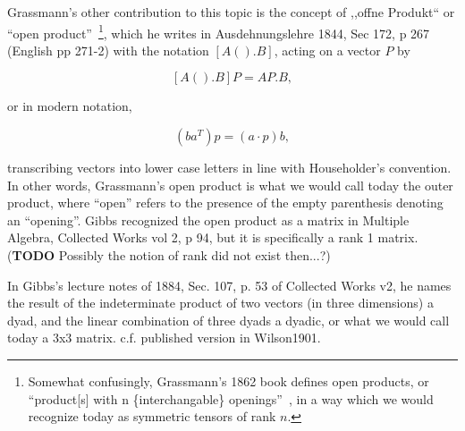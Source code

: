 Grassmann's other contribution to this topic is the concept of ,,offne Produkt`` or ``open product''~\footnote{Somewhat confusingly, Grassmann's 1862 book defines open products, or ``product[s] with n \{interchangable\} openings''~\cite[\S\S 353, p. 196]{Grassmann2000}, in a way which we would recognize today as symmetric tensors of rank $n$.}, which he writes in Ausdehnungslehre 1844, Sec 172, p 267 (English pp 271-2) with the notation $[A() . B]$, acting on a vector $P$ by

\[
[A() . B] P = AP . B,
\]

or in modern notation,

\[
(b a^T) p = (a\cdot p) b,
\]

transcribing vectors into lower case letters in line with Householder's convention. In other words, Grassmann's open product is what we would call today the outer product, where ``open'' refers to the presence of the empty parenthesis denoting an ``opening''. Gibbs recognized the open product as a matrix in Multiple Algebra, Collected Works vol 2, p 94, but it is specifically a rank 1 matrix. (\textbf{TODO} Possibly the notion of rank did not exist then...?) 

In Gibbs's lecture notes of 1884, Sec. 107, p. 53 of Collected Works v2, he names the result of the indeterminate product of two vectors (in three dimensions) a dyad, and the linear combination of three dyads a dyadic, or what we would call today a 3x3 matrix. c.f. published version in Wilson1901.